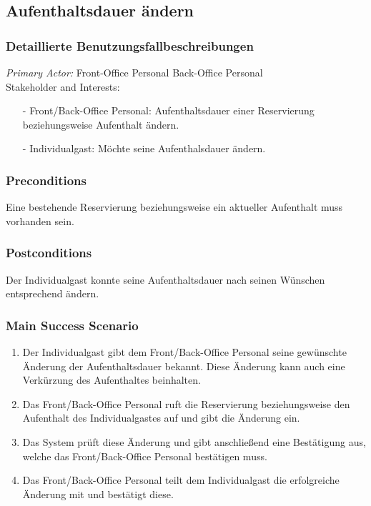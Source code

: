 \documentclass[./detailed_overview_usecases.tex]{subfiles}
\begin{document}
    \subsection{Aufenthaltsdauer ändern}
    \subsubsection{Detaillierte Benutzungsfallbeschreibungen}
    \textit{Primary Actor:}
    Front-Office Personal
	Back-Office Personal
    \\
    Stakeholder and Interests:
    \begin{itemize}
        \item[-] Front/Back-Office Personal: Aufenthaltsdauer einer Reservierung beziehungsweise Aufenthalt ändern.
        \item[-] Individualgast: Möchte seine Aufenthalsdauer ändern.
    \end{itemize}

    \subsubsection*{Preconditions}
	Eine bestehende Reservierung beziehungsweise ein aktueller Aufenthalt muss vorhanden sein.
	
    \subsubsection*{Postconditions}
    Der Individualgast konnte seine Aufenthaltsdauer nach seinen Wünschen entsprechend ändern.
	
    \subsubsection*{Main Success Scenario}
    \begin{enumerate}
        \item Der Individualgast gibt dem Front/Back-Office Personal seine gewünschte Änderung der Aufenthaltsdauer bekannt. Diese Änderung kann auch eine Verkürzung des Aufenthaltes beinhalten.
        \item Das Front/Back-Office Personal ruft die Reservierung beziehungsweise den Aufenthalt des Individualgastes auf und gibt die Änderung ein.
	    \item Das System prüft diese Änderung und gibt anschließend eine Bestätigung aus, welche das Front/Back-Office Personal bestätigen muss.
	    \item Das Front/Back-Office Personal teilt dem Individualgast die erfolgreiche Änderung mit und bestätigt diese.
    \end{enumerate}
\end{document}
